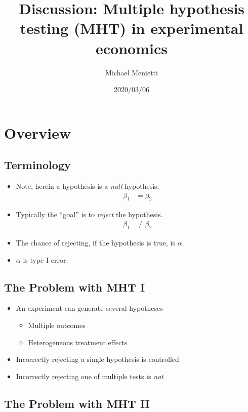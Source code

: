 \documentclass[10pt]{article}
\title{Discussion: Multiple hypothesis testing (MHT) in experimental economics}
\author{Michael Menietti}
\date{2020/03/06}
\begin{document}
	\maketitle

	\section{Overview}

	\subsection{Terminology}
	
	\begin{itemize}
		\item Note, herein a hypothesis is a \emph{null} hypothesis.
			\begin{align*}
				\beta_1 &= \beta_2
			\end{align*}
		\item Typically the ``goal'' is to \emph{reject} the hypothesis.
			\begin{align*}
				\beta_1 &\not= \beta_2
			\end{align*}
		\item The chance of rejecting, if the hypothesis is true, is $\alpha$.
		\item $\alpha$ is type I error.
	\end{itemize}

	\subsection{The Problem with MHT I}

	\begin{itemize}
		\item An experiment can generate several hypotheses
			\begin{itemize}
				\item Multiple outcomes
				\item Heterogeneous treatment effects
			\end{itemize}
		\item Incorrectly rejecting a single hypothesis is controlled
		\item Incorrectly rejecting one of multiple tests is \emph{not}
	\end{itemize}

	\subsection{The Problem with MHT II}
\end{document}
